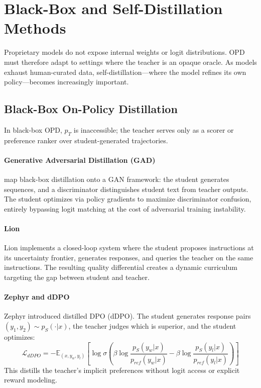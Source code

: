 \documentclass{article} %
\begin{document}
\section{Black-Box and Self-Distillation Methods}
\label{sec:black_box}

Proprietary models do not expose internal weights or logit distributions. OPD must therefore adapt to settings where the teacher is an opaque oracle. As models exhaust human-curated data, self-distillation---where the model refines its own policy---becomes increasingly important.

\subsection{Black-Box On-Policy Distillation}
\label{subsec:black_box}

In black-box OPD, $p_T$ is inaccessible; the teacher serves only as a scorer or preference ranker over student-generated trajectories.

\paragraph{Generative Adversarial Distillation (GAD)}
\citet{2511.10643} map black-box distillation onto a GAN framework: the student generates sequences, and a discriminator distinguishes student text from teacher outputs. The student optimizes via policy gradients to maximize discriminator confusion, entirely bypassing logit matching at the cost of adversarial training instability.

\paragraph{Lion}
Lion \citep{2305.12870} implements a closed-loop system where the student proposes instructions at its uncertainty frontier, generates responses, and queries the teacher on the same instructions. The resulting quality differential creates a dynamic curriculum targeting the gap between student and teacher.

\paragraph{Zephyr and dDPO}
Zephyr \citep{2310.16944} introduced distilled DPO (dDPO). The student generates response pairs $(y_1, y_2) \sim p_S(\cdot|x)$, the teacher judges which is superior, and the student optimizes:
\begin{equation}
    \mathcal{L}_{dDPO} = - \mathbb{E}_{(x, y_w, y_l)} \left[ \log \sigma \left( \beta \log \frac{p_S(y_w|x)}{p_{ref}(y_w|x)} - \beta \log \frac{p_S(y_l|x)}{p_{ref}(y_l|x)} \right) \right]
\end{equation}
This distills the teacher's implicit preferences without logit access or explicit reward modeling.
\end{document}
